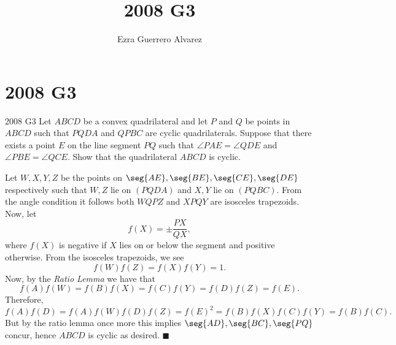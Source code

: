 \documentclass[14pt]{article}
\title{2008 G3}
\author{Ezra Guerrero Alvarez}
\begin{document}
\maketitle
	
\section*{2008 G3}

\begin{statement}{2008 G3}
	Let $ ABCD$ be a convex quadrilateral and let $ P$ and $ Q$ be points in $ ABCD$ such that $ PQDA$ and $ QPBC$ are cyclic quadrilaterals. Suppose that there exists a point $ E$ on the line segment $ PQ$ such that $ \angle PAE = \angle QDE$ and $ \angle PBE = \angle QCE$. Show that the quadrilateral $ ABCD$ is cyclic.
\end{statement}
Let $W,X,Y,Z$ be the points on $\seg{AE},\seg{BE},\seg{CE},\seg{DE}$ respectively such that $W,Z$ lie on $(PQDA)$ and $X,Y$ lie on $(PQBC)$. From the angle condition it follows both $WQPZ$ and $XPQY$ are isosceles trapezoids. Now, let 
\[ f(X)=\pm\frac{PX}{QX}, \]
where $f(X)$ is negative if $X$ lies on or below the segment and positive otherwise. From the isosceles trapezoids, we see
\[ f(W)f(Z)=f(X)f(Y)=1. \]
Now, by the \emph{Ratio Lemma} we have that
\[ f(A)f(W)=f(B)f(X)=f(C)f(Y)=f(D)f(Z)=f(E). \]
Therefore,
\[ f(A)f(D)=f(A)f(W)f(D)f(Z)=f(E)^2=f(B)f(X)f(C)f(Y)=f(B)f(C). \]
But by the ratio lemma once more this implies $\seg{AD},\seg{BC},\seg{PQ}$ concur, hence $ABCD$ is cyclic as desired. $\blacksquare$
	
\end{document}
